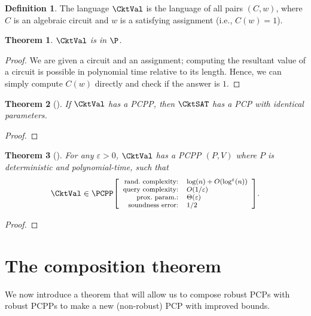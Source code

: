 \documentclass[english,12pt]{reedthesis}
\theoremstyle{plain}
\newtheorem{thm}{Theorem}[section]
\theoremstyle{definition}
\newtheorem{defn}[defn]{Definition}
\theoremstyle{remark}
\newcommand{\pcpp}[4]{%
  \ensuremath%
  \mleft[{\footnotesize\begin{array}{r l}
    \text{rand.\ complexity:} & #1 \\
    \text{query complexity:} & #2 \\
    \text{prox.\ param.:} & #3 \\
    \text{soundness error:} & #4
  \end{array}}\mright]%
}
\begin{document}
\begin{defn}\label{def:cktval}
  The language $\CktVal$ is the language of all pairs $(C, w)$, where $C$ is an
  algebraic circuit and $w$ is a satisfying assignment (i.e., $C(w) = 1$).
\end{defn}

\begin{thm}\label{thm:cktval-in-p}
  $\CktVal$ is in $\P$.
\end{thm}

\begin{proof}
  We are given a circuit and an assignment; computing the resultant value of a
  circuit is possible in polynomial time relative to its length. Hence, we can
  simply compute $C(w)$ directly and check if the answer is $1$.
\end{proof}

\begin{thm}[{\cite[Prop.\ 2.4]{BGHSV06}}]\label{thm:cktval-cktsat}
  If $\CktVal$ has a PCPP, then $\CktSAT$ has a PCP with identical parameters.
\end{thm}

\begin{proof}
\end{proof}

\begin{thm}[{\cite[Theorem 3.3]{BGHSV06}}]\label{thm:ckt-val-pcpp}
  For any $\varepsilon > 0$, $\CktVal$ has a PCPP $(P, V)$ where $P$ is deterministic and
  polynomial-time, such that
  \[
    \CktVal \in \PCPP\pcpp{\log(n) + O(\log^{\varepsilon}(n))}{O(1/\varepsilon)}{\Theta(\varepsilon)}{1/2}.
  \]
\end{thm}

\begin{proof}
\end{proof}

\section{The composition theorem}\label{sec:comp-theorem}

We now introduce a theorem that will allow us to compose robust PCPs with robust
PCPPs to make a new (non-robust) PCP with improved bounds.
\end{document}
